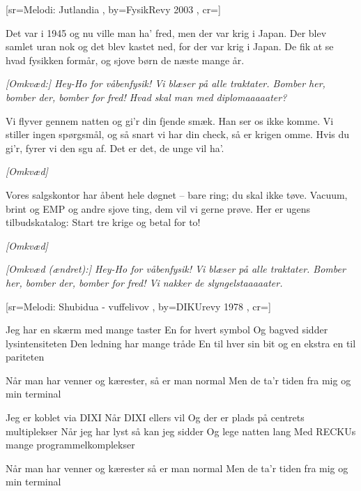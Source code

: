 \documentclass[pdftex,12pt]{article}
\begin{document}
\begin{songs}{}
\endverse
\endsong



[sr={Melodi: Jutlandia}%
,
by={FysikRevy 2003}
,
cr={}]\hypertarget{Våbenfysik}{}
\label{song37}

\beginverse
Det var i 1945 og nu
ville man ha’ fred,
men der var krig i Japan.
Der blev samlet uran nok og det
blev kastet ned,
for der var krig i Japan.
De fik at se hvad fysikken formår,
og sjove børn de næste mange år.

\endverse
\beginverse
\emph{[Omkvæd:]
Hey-Ho for våbenfysik!
Vi blæser på alle traktater.
Bomber her, bomber der, bomber
for fred!
Hvad skal man med diplomaaaaater?}

\endverse
\beginverse
Vi flyver gennem natten og gi’r
din fjende smæk.
Han ser os ikke komme.
Vi stiller ingen spørgsmål, og
så snart vi har din check,
så er krigen omme.
Hvis du gi’r, fyrer vi den sgu af.
Det er det, de unge vil ha’.

\endverse
\beginverse
\emph{[Omkvæd]}

\endverse
\beginverse
Vores salgskontor har åbent hele
døgnet – bare ring;
du skal ikke tøve.
Vacuum, brint og EMP og andre
sjove ting,
dem vil vi gerne prøve.
Her er ugens tilbudskatalog:
Start tre krige og betal for to!

\endverse
\beginverse
\emph{[Omkvæd]}

\endverse
\beginverse
\emph{[Omkvæd (ændret):]
Hey-Ho for våbenfysik!
Vi blæser på alle traktater.
Bomber her, bomber der, bomber
for fred!
Vi nakker de slyngelstaaaaater.}

\endverse
\endsong



[sr={Melodi: Shubidua - vuffelivov}
,
by={DIKUrevy 1978}
,
cr={}]\hypertarget{Terminalsangen}{}
\label{song38}

\beginverse
Jeg har en skærm med mange taster
En for hvert symbol
Og bagved sidder lysintensiteten
Den ledning har mange tråde
En til hver sin bit
og en ekstra en til pariteten

\endverse
\beginverse
Når man har venner og kærester, så er man normal
Men de ta'r tiden fra mig og min terminal

\endverse
\beginverse
Jeg er koblet via DIXI
Når DIXI ellers vil
Og der er plads på centrets multiplekser
Når jeg har lyst så kan jeg sidder
Og lege natten lang
Med RECKUs mange programmelkomplekser

\endverse
\beginverse
Når man har venner og kærester så er man normal
Men de ta'r tiden fra mig og min terminal


\end{songs}
\end{document}
